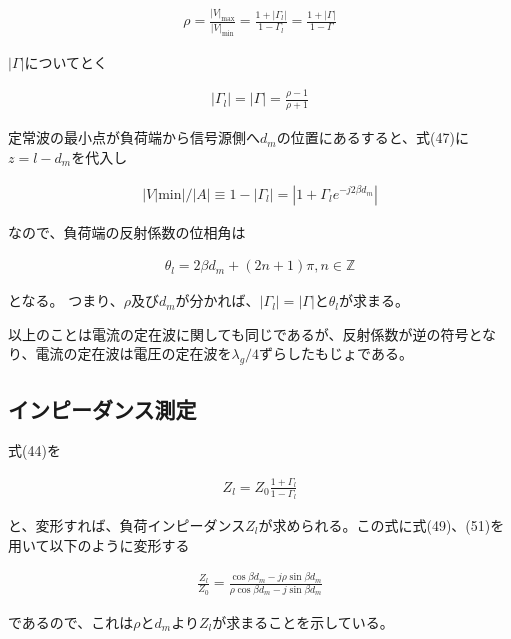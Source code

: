 \documentclass[7pt,uplatex,dvipdfmx,twocolumn]{jsarticle}
\begin{document}
  \begin{align}
  \rho=\frac{\left|V\right|_\mathrm{max}}{\left|V\right|_\mathrm{min}}=\frac{1+\left|\varGamma _l\right|}{1-\varGamma _l}=\frac{1+\left|\varGamma\right|}{1-\varGamma}
  \end{align}
  
  $\left|\varGamma\right|$についてとく
  
  \begin{align}
  \left|\varGamma _l\right|=\left|\varGamma\right|=\frac{\rho-1}{\rho+1}
  \end{align}
  
  定常波の最小点が負荷端から信号源側へ$d_m$の位置にあるすると、式(47)に$z=l-d_m$を代入し
  
  \begin{align}
  \left|V\right|\mathrm{min}|/\left|A\right|\equiv 1-\left|\varGamma _l\right|=\left|1+\varGamma _le^{-j2\beta d_m}\right|
  \end{align}
  
  なので、負荷端の反射係数の位相角は
  
  \begin{align}
  \theta _l=2\beta d_m+\left(2n+1\right)\pi,n\in \mathbb{Z}
  \end{align}
  
  となる。
  つまり、$\rho$及び$d_m$が分かれば、$\left|\varGamma _l\right|=\left|\varGamma\right|$と$\theta_l$が求まる。
  
  以上のことは電流の定在波に関しても同じであるが、反射係数が逆の符号となり、電流の定在波は電圧の定在波を$\lambda _g/4$ずらしたもじょである。
  
  \subsection{インピーダンス測定}
  
  式(44)を
  
  \begin{align}
  Z_l=Z_0\frac{1+\varGamma _l}{1-\varGamma _l}
  \end{align}
  
  と、変形すれば、負荷インピーダンス$Z_l$が求められる。この式に式(49)、(51)を用いて以下のように変形する
  
  \begin{align}
  \frac{Z_l}{Z_0}=\frac{\cos\beta d_m-j\rho \sin\beta d_m}{\rho\cos\beta d_m-j\sin\beta d_m}
  \end{align}
  
  であるので、これは$\rho$と$d_m$より$Z_l$が求まることを示している。
  
\end{document}
